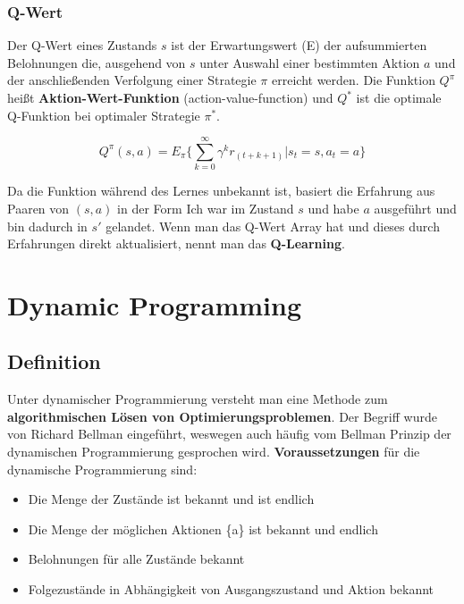\documentclass[10pt]{scrartcl}
\begin{document}
\subsubsection{Q-Wert}
Der Q-Wert eines Zustands $s$ ist der Erwartungswert (E) der aufsummierten Belohnungen die, ausgehend von $s$ unter Auswahl einer bestimmten Aktion $a$ und der anschließenden Verfolgung einer Strategie $\pi$ erreicht werden. Die Funktion $Q^{\pi}$ heißt \textbf{Aktion-Wert-Funktion} (action-value-function) und $Q^{*}$ ist die optimale Q-Funktion bei optimaler Strategie $\pi^{*}$.

\begin{equation}
Q^{\pi}(s,a)= E_{\pi} \{ \sum_{k=0}^\infty \gamma^k r_{(t+k+1)} | s_{t}=s, a_{t}=a \}
\end{equation}

Da die Funktion während des Lernes unbekannt ist, basiert die Erfahrung aus Paaren von $(s,a)$ in der Form \glqq Ich war im Zustand $s$ und habe $a$ ausgeführt und bin dadurch in $s'$ gelandet\grqq\xspace. Wenn man das Q-Wert Array hat und dieses durch Erfahrungen direkt aktualisiert, nennt man das \textbf{Q-Learning}.

\section{Dynamic Programming}
\label{sec:dynamicPrograming}
\subsection{Definition}
Unter dynamischer Programmierung versteht man eine Methode zum \textbf{algorithmischen Lösen von Optimierungsproblemen}. Der Begriff wurde von Richard Bellman eingeführt, weswegen auch häufig vom \glqq Bellman Prinzip der dynamischen Programmierung gesprochen\grqq\xspace wird. \textbf{Voraussetzungen} für die dynamische Programmierung sind:

\begin{itemize}
\item{Die Menge der Zustände ist bekannt und ist endlich}
\item{Die Menge der möglichen Aktionen \{a\} ist bekannt und endlich}
\item{Belohnungen für alle Zustände bekannt}
\item{Folgezustände in Abhängigkeit von Ausgangszustand und Aktion bekannt}
\end{itemize}
\end{document}

